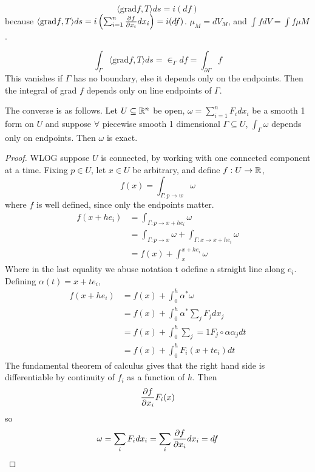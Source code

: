 \documentclass[12pt]{article}
\begin{document}
\begin{rem}
    $$\langle \text{grad} f, T \rangle ds = i(df)$$
    because $\langle \text{grad} f, T \rangle ds = i\left(\sum_{i=1}^n \frac{\partial f}{\partial x_i} dx_i\right) = i(df)$. $\mu_M = dV_M$, and $\int fdV = \int f\mu M$.
\end{rem}

\begin{rem}
    $$\int_\Gamma \langle \text{grad} f, T \rangle ds = \in_\Gamma df = \int_{\partial\Gamma} f$$
    This vanishes if $\Gamma$ has no boundary, else it depends only on the endpoints. Then the integral of grad $f$ depends only on line endpoints of $\Gamma$.
\end{rem}

The converse is as follows. Let $U \subseteq \mathbb{R}^n$ be open, $\omega = \sum_{i=1}^n F_i dx_i$ be a smooth 1 form on $U$ and suppose $\forall$ piecewise smooth 1 dimensional $\Gamma \subseteq U$, $\int_\Gamma \omega$ depends only on endpoints. Then $\omega$ is exact.

\begin{proof}
    WLOG suppose $U$ is connected, by working with one connected component at a time. Fixing $p \in U$, let $x \in U$ be arbitrary, and define $f: U \rightarrow \mathbb{R}$,
    $$f(x) = \int_{\Gamma: p \rightarrow w} \omega$$
    where $f$ is well defined, since only the endpoints matter.
    \begin{align*}
        f(x + he_i) &= \int_{\Gamma: p \rightarrow x + he_i} \omega \\
                    &= \int_{\Gamma: p \rightarrow x} \omega + \int_{\Gamma: x \rightarrow x + he_i} \omega \\
                    &= f(x) + \int_x^{x+he_i} \omega
    \end{align*}
    Where in the last equality we abuse notation t odefine a straight line along $e_i$. Defining $\alpha(t) = x + te_i$,
    \begin{align*}
        f(x+he_i) &= f(x) + \int_0^h \alpha^*\omega \\
                  &= f(x) + \int_0^h \alpha^* \sum_j F_j dx_j \\
                  &= f(x) + \int_0^h \sum_j=1 F_j \circ \alpha \alpha_j dt \\
                  &= f(x) + \int_0^h F_i(x + te_i) dt
    \end{align*}
    The fundamental theorem of calculus gives that the right hand side is differentiable by continuity of $f_i$ as a function of $h$. Then
    $$\frac{\partial f}{\partial x_i} F_i(x)$$
    so
    $$\omega = \sum_i F_i dx_i = \sum_i \frac{\partial f}{\partial x_i}dx_i = df$$
\end{proof}
\end{document}
